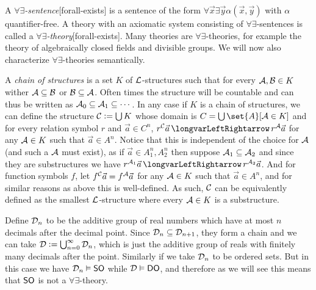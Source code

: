A {\it $\forall\exists$-sentence}[forall-exists] is a sentence of the form $\forall\vec x\exists\vec y\alpha(\vec x,\vec y)$ with $\alpha$ quantifier-free.
A theory with an axiomatic system consisting of $\forall\exists$-sentences is called a {\it $\forall\exists$-theory}[forall-exists].
Many theories are $\forall\exists$-theories, for example the theory of algebraically closed fields and divisible groups.
We will now also characterize $\forall\exists$-theories semantically.

A {\it chain of structures} is a set $K$ of ${\cal L}$-structures such that for every ${\cal A},{\cal B}\in K$ wither ${\cal A}\subseteq{\cal B}$ or ${\cal B}\subseteq{\cal A}$.
Often times the structure will be countable and can thus be written as ${\cal A}_0\subseteq{\cal A}_1\subseteq\cdots$.
In any case if $K$ is a chain of structures, we can define the structure ${\cal C}\coloneqq\bigcup K$ whose domain is $C=\bigcup\set{A}[{\cal A}\in K]$ and for every relation symbol $r$ and $\vec a\in C^n$,
$r^{\cal C}\vec a\iff r^{\cal A}\vec a$ for any ${\cal A}\in K$ such that $\vec a\in A^n$.
Notice that this is independent of the choice for ${\cal A}$ (and such a ${\cal A}$ must exist), as if $\vec a\in A_1^n,A_2^n$ then suppose ${\cal A}_1\subseteq{\cal A}_2$ and since they are substructures
we have $r^{{\cal A}_1}\vec a\iff r^{{\cal A}_2}\vec a$.
And for function symbols $f$, let $f^{\cal C}\vec a=f^{\cal A}\vec a$ for any ${\cal A}\in K$ such that $\vec a\in A^n$, and for similar reasons as above this is well-defined.
As such, ${\cal C}$ can be equivalently defined as the smallest ${\cal L}$-structure where every ${\cal A}\in K$ is a substructure.

\bexam[name=sodecimalexam]

    Define ${\cal D}_n$ to be the additive group of real numbers which have at most $n$ decimals after the decimal point.
    Since ${\cal D}_n\subseteq{\cal D}_{n+1}$, they form a chain and we can take ${\cal D}\coloneqq\bigcup_{n=0}^\infty{\cal D}_n$, which is just the additive group of reals with finitely many decimals
    after the point.
    Similarly if we take ${\cal D}_n$ to be ordered sets.
    But in this case we have ${\cal D}_n\vDash{\sf SO}$ while ${\cal D}\vDash{\sf DO}$, and therefore as we will see this means that ${\sf SO}$ is not a $\forall\exists$-theory.

\eexam

